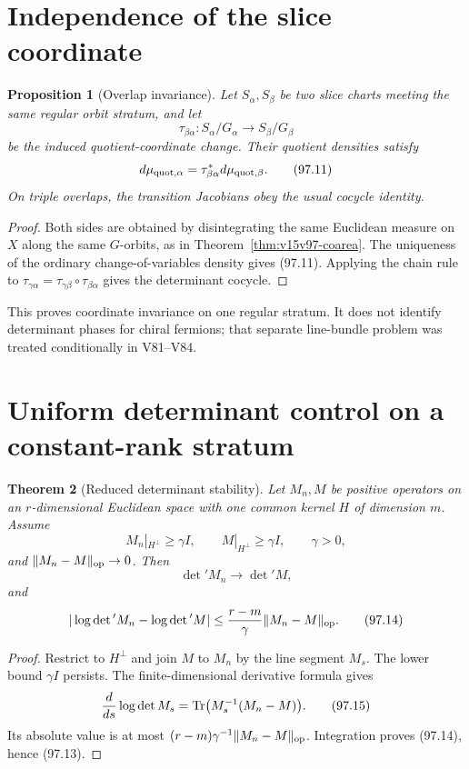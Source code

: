 \documentclass[11pt]{article}
\newtheorem{theorem}{Theorem}[section]
\newtheorem{proposition}[theorem]{Proposition}
\theoremstyle{remark}
\begin{document}
\section{Independence of the slice coordinate}

\begin{proposition}[Overlap invariance]
\label{prop:v15v97-overlap}
Let \(S_\alpha,S_\beta\) be two slice charts meeting the same regular
orbit stratum, and let
\[
 \tau_{\beta\alpha}:S_\alpha/G_\alpha
 \longrightarrow S_\beta/G_\beta                    \tag{97.10}
\]
be the induced quotient-coordinate change.  Their quotient
densities satisfy
\[
 d\mu_{{\rm quot},\alpha}
 =\tau_{\beta\alpha}^*
   d\mu_{{\rm quot},\beta}.                           \tag{97.11}
\]
On triple overlaps, the transition Jacobians obey the usual
cocycle identity.
\end{proposition}

\begin{proof}
Both sides are obtained by disintegrating the same Euclidean
measure on \(X\) along the same \(G\)-orbits, as in
Theorem~\ref{thm:v15v97-coarea}.  The uniqueness of the ordinary
change-of-variables density gives (97.11).  Applying the chain rule
to
\(\tau_{\gamma\alpha}
=\tau_{\gamma\beta}\circ\tau_{\beta\alpha}\)
gives the determinant cocycle.
\end{proof}

This proves coordinate invariance on one regular stratum.  It does
not identify determinant phases for chiral fermions; that separate
line-bundle problem was treated conditionally in V81--V84.

\section{Uniform determinant control on a constant-rank stratum}

\begin{theorem}[Reduced determinant stability]
\label{thm:v15v97-det-stability}
Let \(M_n,M\) be positive operators on an \(r\)-dimensional
Euclidean space with one common kernel \(H\) of dimension \(m\).
Assume
\[
 M_n|_{H^\perp}\geq\gamma I,\qquad
 M|_{H^\perp}\geq\gamma I,\qquad \gamma>0,             \tag{97.12}
\]
and \(\|M_n-M\|_{\rm op}\to0\).  Then
\[
 \det{}'M_n\longrightarrow\det{}'M,                   \tag{97.13}
\]
and
\[
 |\log\det{}'M_n-\log\det{}'M|
 \leq {r-m\over\gamma}\|M_n-M\|_{\rm op}.              \tag{97.14}
\]
\end{theorem}

\begin{proof}
Restrict to \(H^\perp\) and join \(M\) to \(M_n\) by the line
segment \(M_s\).  The lower bound \(\gamma I\) persists.  The
finite-dimensional derivative formula gives
\[
 {d\over ds}\log\det M_s
 =\operatorname{Tr}\bigl(M_s^{-1}(M_n-M)\bigr).        \tag{97.15}
\]
Its absolute value is at most
\((r-m)\gamma^{-1}\|M_n-M\|_{\rm op}\).  Integration proves
(97.14), hence (97.13).
\end{proof}
\end{document}
